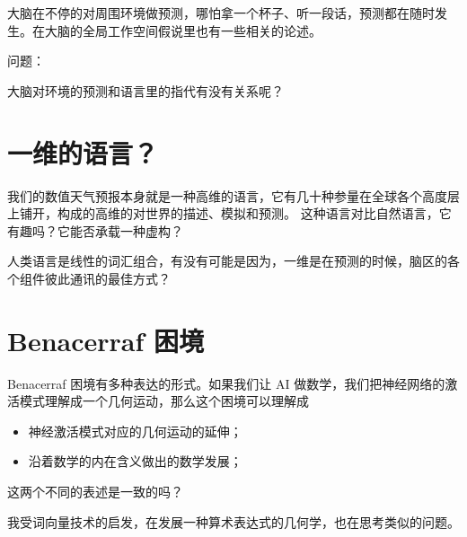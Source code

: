 \documentclass[a4paper,12pt]{article}
\numberwithin{problem}{section}
\numberwithin{definition}{section}
\numberwithin{lemma}{section}
\numberwithin{proposition}{section}
\numberwithin{theorem}{section}
\numberwithin{grammar}{section}
\numberwithin{program}{section}
\numberwithin{convention}{section}
\numberwithin{corollary}{section}
\begin{document}
大脑在不停的对周围环境做预测，哪怕拿一个杯子、听一段话，预测都在随时发生。在大脑的全局工作空间假说里也有一些相关的论述。

问题：
\begin{displayquote}
大脑对环境的预测和语言里的指代有没有关系呢？
\end{displayquote}

\section{一维的语言？}

我们的数值天气预报本身就是一种高维的语言，它有几十种参量在全球各个高度层上铺开，构成的高维的对世界的描述、模拟和预测。
这种语言对比自然语言，它有趣吗？它能否承载一种虚构？

人类语言是线性的词汇组合，有没有可能是因为，一维是在预测的时候，脑区的各个组件彼此通讯的最佳方式？

\section{Benacerraf 困境}

Benacerraf 困境有多种表达的形式。如果我们让 AI 做数学，我们把神经网络的激活模式理解成一个几何运动，那么这个困境可以理解成
\begin{itemize}
\item 神经激活模式对应的几何运动的延伸；
\item 沿着数学的内在含义做出的数学发展；
\end{itemize}
这两个不同的表述是一致的吗？

我受词向量技术的启发，在发展一种算术表达式的几何学，也在思考类似的问题。
\end{document}

